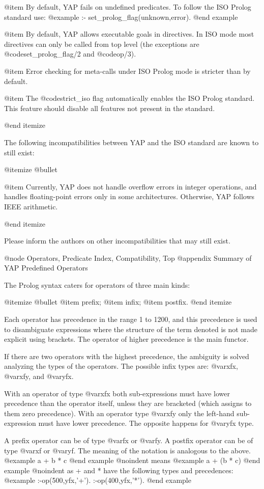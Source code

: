 {{{{{{{{{@item By default, YAP fails on undefined predicates. To follow the ISO
Prolog standard use:
@example
:- set_prolog_flag(unknown,error).
@end example

@item By default, YAP allows executable goals in directives. In ISO mode
most directives can only be called from top level (the exceptions are
@code{set_prolog_flag/2} and @code{op/3}).

@item Error checking for meta-calls under ISO Prolog mode is stricter
than by default.

@item The @code{strict_iso} flag automatically enables the ISO Prolog
standard. This feature should disable all features not present in the
standard.

@end itemize

The following incompatibilities between YAP and the ISO standard are
known to still exist:

@itemize @bullet

@item Currently, YAP does not handle overflow errors in integer
operations, and handles floating-point errors only in some
architectures. Otherwise, YAP follows IEEE arithmetic.

@end itemize

Please inform the authors on other incompatibilities that may still
exist.

@node Operators, Predicate Index, Compatibility, Top
@appendix Summary of YAP Predefined Operators


 The Prolog syntax caters for operators of three main kinds:

@itemize @bullet
@item
prefix;
@item
infix;
@item
postfix.
@end itemize

 Each operator has precedence in the range 1 to 1200, and this 
precedence is used to disambiguate expressions where the structure of the 
term denoted is not made explicit using brackets. The operator of higher 
precedence is the main functor.

 If there are two operators with the highest precedence, the ambiguity 
is solved analyzing the types of the operators. The possible infix types are: 
@var{xfx}, @var{xfy}, and @var{yfx}.

 With an operator of type @var{xfx} both sub-expressions must have lower 
precedence than the operator itself, unless they are bracketed (which 
assigns to them zero precedence). With an operator type @var{xfy} only the  
left-hand sub-expression must have lower precedence. The opposite happens 
for @var{yfx} type.

 A prefix operator can be of type @var{fx} or @var{fy}. 
A postfix operator can be of type @var{xf} or @var{yf}. 
The meaning of the notation is analogous to the above.
@example
a + b * c
@end example
@noindent
means
@example
a + (b * c)
@end example
@noindent
as + and * have the following types and precedences:
@example
:-op(500,yfx,'+').
:-op(400,yfx,'*').
@end example

}}}}}}}}}

